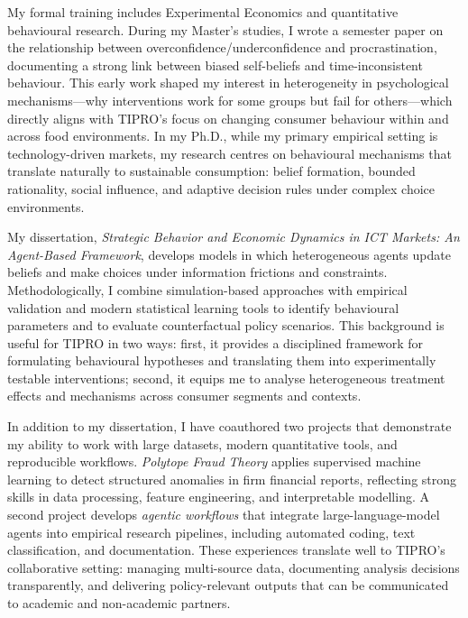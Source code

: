 \documentclass[11pt]{article}
\begin{document}
\bigskip

My formal training includes Experimental Economics and quantitative behavioural research. During my Master’s studies, I wrote a semester paper on the relationship between overconfidence/underconfidence and procrastination, documenting a strong link between biased self-beliefs and time-inconsistent behaviour. This early work shaped my interest in heterogeneity in psychological mechanisms---why interventions work for some groups but fail for others---which directly aligns with TIPRO’s focus on changing consumer behaviour within and across food environments. In my Ph.D., while my primary empirical setting is technology-driven markets, my research centres on behavioural mechanisms that translate naturally to sustainable consumption: belief formation, bounded rationality, social influence, and adaptive decision rules under complex choice environments.

\bigskip

My dissertation, \textit{Strategic Behavior and Economic Dynamics in ICT Markets: An Agent-Based Framework}, develops models in which heterogeneous agents update beliefs and make choices under information frictions and constraints. Methodologically, I combine simulation-based approaches with empirical validation and modern statistical learning tools to identify behavioural parameters and to evaluate counterfactual policy scenarios. This background is useful for TIPRO in two ways: first, it provides a disciplined framework for formulating behavioural hypotheses and translating them into experimentally testable interventions; second, it equips me to analyse heterogeneous treatment effects and mechanisms across consumer segments and contexts.

\bigskip

In addition to my dissertation, I have coauthored two projects that demonstrate my ability to work with large datasets, modern quantitative tools, and reproducible workflows. \textit{Polytope Fraud Theory} applies supervised machine learning to detect structured anomalies in firm financial reports, reflecting strong skills in data processing, feature engineering, and interpretable modelling. A second project develops \textit{agentic workflows} that integrate large-language-model agents into empirical research pipelines, including automated coding, text classification, and documentation. These experiences translate well to TIPRO’s collaborative setting: managing multi-source data, documenting analysis decisions transparently, and delivering policy-relevant outputs that can be communicated to academic and non-academic partners.
\end{document}
